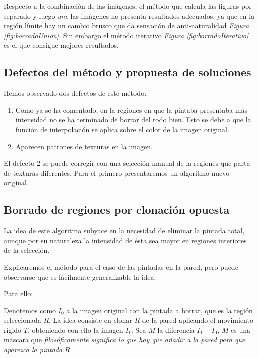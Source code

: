 \documentclass[11pt,twoside,titlepage,a4paper]{article}
\numberwithin{equation}{section} %
\theoremstyle{usual}
\begin{document}
Respecto a la combinación de las imágenes, el método que calcula las figuras por separado y luego \textit{une} las imágenes no presenta resultados adecuados, ya que en la región límite hay un cambio brusco que da sensación de anti-naturalidad \textit{Figura \ref{fig:borradoUnion}}. Sin embargo el método iterativo \textit{Figura \ref{fig:borradoIterativo}} es el que consigue mejores resultados.

\subsection{Defectos del método y propuesta de soluciones}

Hemos observado dos defectos de este método:

\begin{enumerate}
    \item Como ya se ha comentado, en la regiones en que la pintaba presentaba más intensidad no se ha terminado de borrar del todo bien. Esto se debe a que la función de interpolación se aplica sobre el color de la imagen original. 
    \item Aparecen patrones de texturas en la imagen. 
\end{enumerate}

El defecto 2 se puede corregir con una selección manual de la regiones que parta de texturas diferentes. Para el primero  presentaremos un algoritmo nuevo original.

\subsection{Borrado de regiones por clonación opuesta}

La idea de este algoritmo subyace en la necesidad de eliminar la pintada total, aunque por su naturaleza  la intensidad de ésta sea mayor en regiones interiores de la selección. 

Explicaremos el método para el caso de las pintadas en la pared, pero puede observarse que es fácilmente generalizable la idea. 

Para ello: 

Denotemos como $I_0$ a la imagen original con la pintada a borrar, que es la región seleccionada $R$.
La idea consiste en clonar $R$  de la pared aplicando el movimiento rígido $T$, obteniendo con ello la imagen $I_1$. 
Sea $M$ la  diferencia $I_1 - I_0$, $M$ es una máscara que \textit{filosóficamente significa lo que hay que añadir a la pared para que aparezca la pintada} $R$.
\end{document}
